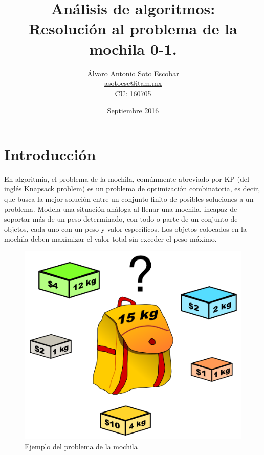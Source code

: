 \documentclass{article}
\title{Análisis de algoritmos: \\ Resolución al problema de la mochila 0-1.}
\author{Álvaro Antonio Soto Escobar \\ \href{mailto:asotoesc@itam.mx}{asotoesc@itam.mx} \\
CU: 160705}
\date{Septiembre 2016}
\begin{document}
\maketitle

\section{Introducción}
En algoritmia, el problema de la mochila, comúnmente abreviado por KP (del inglés Knapsack problem) es un problema de optimización combinatoria, es decir, que busca la mejor solución entre un conjunto finito de posibles soluciones a un problema. Modela una situación análoga al llenar una mochila, incapaz de soportar más de un peso determinado, con todo o parte de un conjunto de objetos, cada uno con un peso y valor específicos. Los objetos colocados en la mochila deben maximizar el valor total sin exceder el peso máximo.

\begin{figure}[h!]
    \centering
    \includegraphics[scale=0.3]{img/Knapsack.png}
    \caption{Ejemplo del problema de la mochila}
    \label{fig:knapsack}
\end{figure}
\end{document}
